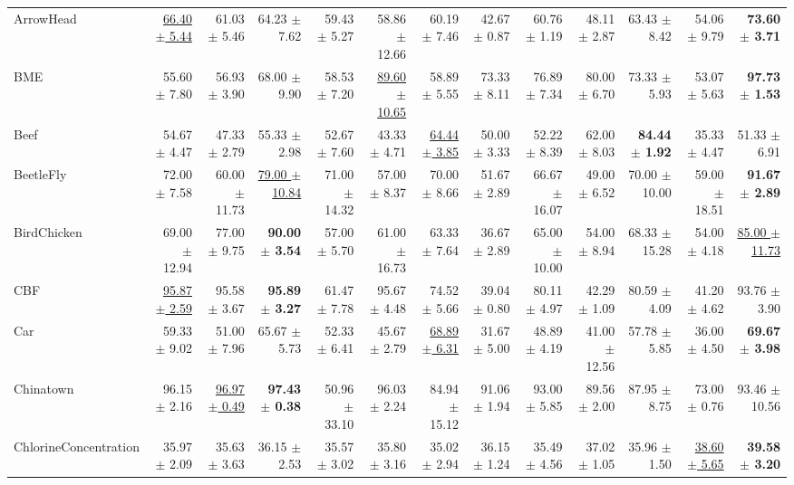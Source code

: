 \begin{landscape}
\begin{longtable}{lrrrrrrrrrrrr}
ArrowHead & \underline{66.40 $\pm$ 5.44} & 61.03 $\pm$ 5.46 & 64.23 $\pm$ 7.62 & 59.43 $\pm$ 5.27 & 58.86 $\pm$ 12.66 & 60.19 $\pm$ 7.46 & 42.67 $\pm$ 0.87 & 60.76 $\pm$ 1.19 & 48.11 $\pm$ 2.87 & 63.43 $\pm$ 8.42 & 54.06 $\pm$ 9.79 & \textbf{73.60 $\pm$ 3.71} \\
BME & 55.60 $\pm$ 7.80 & 56.93 $\pm$ 3.90 & 68.00 $\pm$ 9.90 & 58.53 $\pm$ 7.20 & \underline{89.60 $\pm$ 10.65} & 58.89 $\pm$ 5.55 & 73.33 $\pm$ 8.11 & 76.89 $\pm$ 7.34 & 80.00 $\pm$ 6.70 & 73.33 $\pm$ 5.93 & 53.07 $\pm$ 5.63 & \textbf{97.73 $\pm$ 1.53} \\
Beef & 54.67 $\pm$ 4.47 & 47.33 $\pm$ 2.79 & 55.33 $\pm$ 2.98 & 52.67 $\pm$ 7.60 & 43.33 $\pm$ 4.71 & \underline{64.44 $\pm$ 3.85} & 50.00 $\pm$ 3.33 & 52.22 $\pm$ 8.39 & 62.00 $\pm$ 8.03 & \textbf{84.44 $\pm$ 1.92} & 35.33 $\pm$ 4.47 & 51.33 $\pm$ 6.91 \\
BeetleFly & 72.00 $\pm$ 7.58 & 60.00 $\pm$ 11.73 & \underline{79.00 $\pm$ 10.84} & 71.00 $\pm$ 14.32 & 57.00 $\pm$ 8.37 & 70.00 $\pm$ 8.66 & 51.67 $\pm$ 2.89 & 66.67 $\pm$ 16.07 & 49.00 $\pm$ 6.52 & 70.00 $\pm$ 10.00 & 59.00 $\pm$ 18.51 & \textbf{91.67 $\pm$ 2.89} \\
BirdChicken & 69.00 $\pm$ 12.94 & 77.00 $\pm$ 9.75 & \textbf{90.00 $\pm$ 3.54} & 57.00 $\pm$ 5.70 & 61.00 $\pm$ 16.73 & 63.33 $\pm$ 7.64 & 36.67 $\pm$ 2.89 & 65.00 $\pm$ 10.00 & 54.00 $\pm$ 8.94 & 68.33 $\pm$ 15.28 & 54.00 $\pm$ 4.18 & \underline{85.00 $\pm$ 11.73} \\
CBF & \underline{95.87 $\pm$ 2.59} & 95.58 $\pm$ 3.67 & \textbf{95.89 $\pm$ 3.27} & 61.47 $\pm$ 7.78 & 95.67 $\pm$ 4.48 & 74.52 $\pm$ 5.66 & 39.04 $\pm$ 0.80 & 80.11 $\pm$ 4.97 & 42.29 $\pm$ 1.09 & 80.59 $\pm$ 4.09 & 41.20 $\pm$ 4.62 & 93.76 $\pm$ 3.90 \\
Car & 59.33 $\pm$ 9.02 & 51.00 $\pm$ 7.96 & 65.67 $\pm$ 5.73 & 52.33 $\pm$ 6.41 & 45.67 $\pm$ 2.79 & \underline{68.89 $\pm$ 6.31} & 31.67 $\pm$ 5.00 & 48.89 $\pm$ 4.19 & 41.00 $\pm$ 12.56 & 57.78 $\pm$ 5.85 & 36.00 $\pm$ 4.50 & \textbf{69.67 $\pm$ 3.98} \\
Chinatown & 96.15 $\pm$ 2.16 & \underline{96.97 $\pm$ 0.49} & \textbf{97.43 $\pm$ 0.38} & 50.96 $\pm$ 33.10 & 96.03 $\pm$ 2.24 & 84.94 $\pm$ 15.12 & 91.06 $\pm$ 1.94 & 93.00 $\pm$ 5.85 & 89.56 $\pm$ 2.00 & 87.95 $\pm$ 8.75 & 73.00 $\pm$ 0.76 & 93.46 $\pm$ 10.56 \\
ChlorineConcentration & 35.97 $\pm$ 2.09 & 35.63 $\pm$ 3.63 & 36.15 $\pm$ 2.53 & 35.57 $\pm$ 3.02 & 35.80 $\pm$ 3.16 & 35.02 $\pm$ 2.94 & 36.15 $\pm$ 1.24 & 35.49 $\pm$ 4.56 & 37.02 $\pm$ 1.05 & 35.96 $\pm$ 1.50 & \underline{38.60 $\pm$ 5.65} & \textbf{39.58 $\pm$ 3.20} \\

\end{longtable}
\end{landscape}

